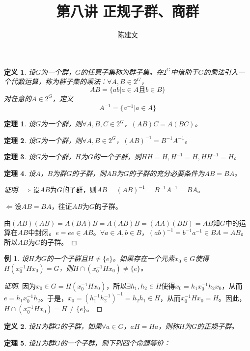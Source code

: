\documentclass{article}
\newtheorem{Def}{定义}
\newtheorem{Thm}{定理}
\newtheorem*{Example}{例}
\begin{document}
\begin{CJK*}{UTF8}{gbsn}
  \title{第八讲 正规子群、商群}
  \author{陈建文}
  \maketitle
  

\begin{Def}
  设$G$为一个群，$G$的任意子集称为群子集。在$2^G$中借助于$G$的乘法引入一个代数运算，称为群子集的乘法：$\forall A,B\in 2^G$，
  \[AB=\{ab|a\in A \text{且} b\in B\}\]
  对任意的$A\in 2^G$，定义
\[A^{-1}=\{a^{-1}|a\in A\}\]
\end{Def}

\begin{Thm}
  设$G$为一个群，则$\forall A,B,C\in 2^G$，$(AB)C=A(BC)$。
\end{Thm}

\begin{Thm}
  设$G$为一个群，则$\forall A,B\in 2^G$，$(AB)^{-1}=B^{-1}A^{-1}$。
\end{Thm}

\begin{Thm}
  设$G$为一个群，$H$为$G$的一个子群，则$HH=H,H^{-1}=H,HH^{-1}=H$。
\end{Thm}

\begin{Thm}
设$A$，$B$为群$G$的子群，则$AB$为$G$的子群的充分必要条件为$AB=BA$。
\end{Thm}
\begin{proof}[证明]
  $\Rightarrow$设$AB$为$G$的子群，则$AB=(AB)^{-1}=B^{-1}A^{-1}=BA$。

$\Leftarrow$设$AB=BA$，往证$AB$为$G$的子群。

由$(AB)(AB)=A(BA)B=A(AB)B=(AA)(BB)=AB$知$G$中的运算在$AB$中封闭。$e=ee\in AB$。$\forall a\in A, b\in B$，$(ab)^{-1}=b^{-1}a^{-1}\in BA=AB$。所以$AB$为$G$的子群。
\end{proof}
\begin{Example}
设$H$为$G$的一个子群且$H\neq \{e\}$。如果存在一个元素$x_0\in G$使得$H(x_0^{-1}Hx_0)=G$，则$H\cap (x_0^{-1}Hx_0)\neq \{e\}$。
\end{Example}
\begin{proof}[证明]
  因为$x_0\in G=H(x_0^{-1}Hx_0)$，所以$\exists h_1,h_2\in H$使得$x_0=h_1x_0^{-1}h_2x_0$，从而$e=h_1x_0^{-1}h_2$。于是，$x_0=(h_1^{-1}h_2^{-1})^{-1}=h_2h_1\in H$，从而$x_0^{-1}Hx_0=H$。因此，$H\cap (x_0^{-1}Hx_0)=H\neq \{e\}$。
\end{proof}
\begin{Def}
  设$H$为群$G$的子群，如果$\forall a\in G$，$aH=Ha$，则称$H$为$G$的正规子群。
\end{Def}
\begin{Thm}
 设$H$为群$G$的一个子群，则下列四个命题等价：


\end{Thm}
\end{CJK*}
\end{document}
